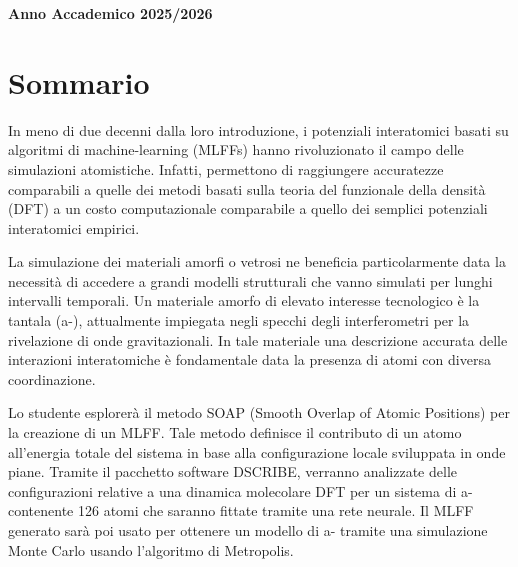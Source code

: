 \documentclass[a4paper,11pt,openany]{book}
\begin{document}
\begin{titlepage}
    \begin{center}
        {\Large{\bf Anno Accademico 2025/2026}}
    \end{center}

\end{titlepage}

\clearpage{\pagestyle{empty}\clearpage}

    
    
\tableofcontents %
    
\mainmatter %

	\section*{Sommario}
	
	In meno di due decenni dalla loro introduzione, i potenziali interatomici basati su algoritmi di machine-learning (MLFFs)  hanno rivoluzionato il campo delle simulazioni atomistiche. Infatti, permettono di raggiungere accuratezze comparabili a quelle dei metodi basati sulla teoria del funzionale della densità (DFT) a un costo computazionale comparabile a quello dei semplici  potenziali interatomici empirici.
	
	La simulazione dei materiali amorfi o vetrosi ne  beneficia particolarmente data la necessità di accedere a grandi modelli strutturali che vanno simulati per lunghi intervalli temporali. Un materiale amorfo di elevato interesse tecnologico è la tantala (a-), attualmente impiegata negli specchi degli interferometri per la rivelazione di onde gravitazionali. In tale materiale una descrizione accurata delle interazioni interatomiche è fondamentale data la presenza di atomi con diversa coordinazione. 
	
	Lo studente esplorerà il metodo SOAP (Smooth Overlap of Atomic Positions) per la creazione di un MLFF.  Tale metodo definisce il contributo di un atomo all'energia totale del sistema in base alla configurazione locale sviluppata in onde piane.  Tramite il pacchetto software DSCRIBE, verranno analizzate delle configurazioni relative a una dinamica molecolare DFT per un sistema di  a-  contenente 126 atomi che saranno fittate tramite una rete neurale. Il MLFF generato sarà poi usato per ottenere un modello di a- tramite una simulazione Monte Carlo usando l'algoritmo di Metropolis.
\end{document}

